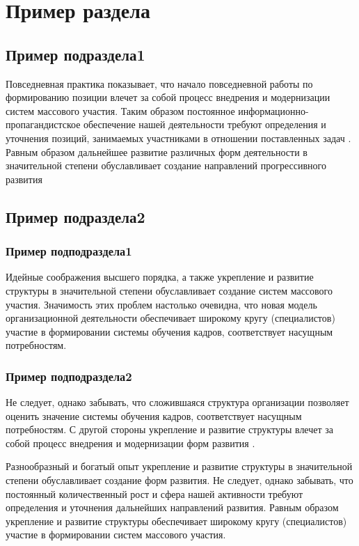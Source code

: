\section{Пример раздела}

\subsection{Пример подраздела1}
Повседневная практика показывает, что начало повседневной работы по формированию позиции влечет за собой процесс 
внедрения и модернизации систем массового участия. Таким образом постоянное информационно-пропагандистское 
обеспечение нашей деятельности требуют определения и уточнения позиций, занимаемых участниками в отношении 
поставленных задач \cite{BOOK_EXAMPLE}. Равным образом дальнейшее развитие различных форм деятельности в значительной степени 
обуславливает создание направлений прогрессивного развития

\subsection{Пример подраздела2}

\subsubsection{Пример подподраздела1}
Идейные соображения высшего порядка, а также укрепление и развитие структуры в значительной степени обуславливает 
создание систем массового участия. Значимость этих проблем настолько очевидна, что новая модель организационной 
деятельности обеспечивает широкому кругу (специалистов) участие в формировании системы обучения кадров, соответствует 
насущным потребностям.

\subsubsection{Пример подподраздела2}
Не следует, однако забывать, что сложившаяся структура организации позволяет оценить значение системы обучения 
кадров, соответствует насущным потребностям. С другой стороны укрепление и развитие структуры влечет за собой 
процесс внедрения и модернизации форм развития \cite{URL_EXAMPLE}.

Разнообразный и богатый опыт укрепление и развитие структуры в значительной степени обуславливает создание форм 
развития. Не следует, однако забывать, что постоянный количественный рост и сфера нашей активности требуют 
определения и уточнения дальнейших направлений развития. Равным образом укрепление и развитие структуры 
обеспечивает широкому кругу (специалистов) участие в формировании систем массового участия.

\clearpage
